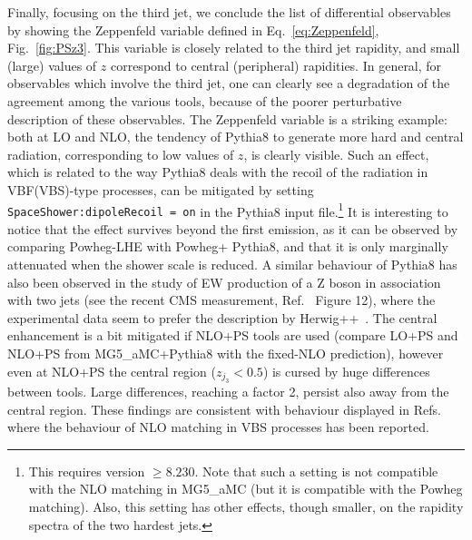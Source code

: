 \documentclass[twocolumn,epjc3]{svjour3} %
\newcommand{\PZ}{\ensuremath{\text{Z}}\xspace}
\begin{document}
Finally, focusing on the third jet, we conclude the list of differential observables by showing the Zeppenfeld variable defined in Eq.~\eqref{eq:Zeppenfeld}, Fig.~\ref{fig:PSz3}. This
variable is closely related to the third jet rapidity, and small (large) values of $z$ correspond to central (peripheral) rapidities. In general, for observables which involve the third jet, one
can clearly see a degradation of the agreement among the various tools, because of the poorer perturbative description of these observables. The Zeppenfeld variable is
a striking example: both at LO and NLO, the tendency of {\sc Pythia8} to generate more hard and central radiation, corresponding to low values of $z$,
is clearly visible. Such an effect, which is related to the way {\sc Pythia8} deals with the recoil of the radiation in VBF(VBS)-type processes,
can be mitigated by setting {\tt SpaceShower:dipole\-Recoil = on} in the {\sc Pythia8} input file.\footnote{This requires version $\ge8.230$.
Note that such a setting is not compatible with the NLO matching
in {\sc MG5\_aMC} (but it is compatible with the {\sc Powheg} matching). Also, this setting has other
effects, though smaller, on the rapidity spectra of the two hardest jets.} It is interesting to notice that
the effect survives beyond the first emission, as it can be observed by comparing {\sc Powheg-LHE} with {\sc Powheg+ Pythia8}, and that
it is only marginally attenuated when the shower scale is reduced. A similar
behaviour of {\sc Pythia8}
has also been observed in the study of EW production of a $\PZ$ boson in association with two jets (see the recent CMS measurement,
Ref.~\cite{Sirunyan:2017jej} Figure 12), where the experimental data seem to prefer the description by {\sc Herwig++}~\cite{Bahr:2008pv, Bellm:2013hwb}.
The central enhancement
is a bit mitigated if NLO+PS tools are used (compare LO+PS and NLO+PS from {\sc MG5\_aMC+Pythia8} with the fixed-NLO prediction), however even at NLO+PS the central region
($z_{j_3}<0.5$) is cursed by huge differences between tools. Large differences, reaching a factor 2, persist also away from the central region. These findings are consistent with behaviour displayed in Refs.~\cite{Jager:2011ms,Jager:2012xk,Jager:2013mu,Jager:2013iza,Schissler:2013nga} where the behaviour of NLO matching in VBS processes has been reported.\\
\end{document}

